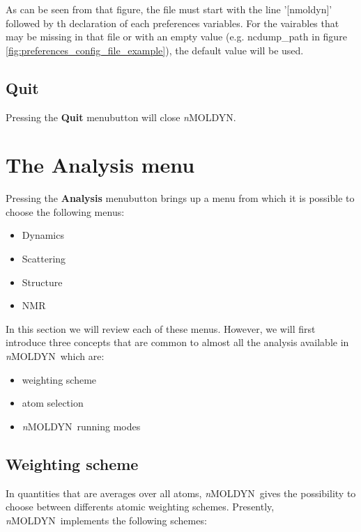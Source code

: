 \documentclass[a4paper,11pt]{report}
\newcommand{\NMOLDYN}{\textit{n}MOLDYN}
\begin{document}
As can be seen from that figure, the file must start with the line '[nmoldyn]' followed by th declaration of each preferences 
variables. For the vairables that may be missing in that file or with an empty value (e.g. ncdump\_path in figure 
\ref{fig:preferences_config_file_example}), the default value will be used.

\subsection{Quit}
\label{quit}
Pressing the \textbf{Quit} menubutton will close \NMOLDYN .

\section{The \textbf{Analysis} menu}
\label{analysis_menu}
Pressing the \textbf{Analysis} menubutton brings up a menu from which it is possible to choose the following menus:
\begin{itemize}
\item Dynamics
\item Scattering
\item Structure
\item NMR
\end{itemize}

In this section we will review each of these menus. However, we will first introduce three concepts that are common 
to almost all the analysis available in \NMOLDYN\ which are:
\begin{itemize}
\item weighting scheme
\item atom selection
\item \NMOLDYN\ running modes
\end{itemize}
\newpage
\subsection{Weighting scheme}
\label{weighting_scheme}
In quantities that are averages over all atoms, \NMOLDYN\ gives the possibility to choose between differents atomic weighting 
schemes. Presently, \NMOLDYN\ implements the following schemes:
\end{document}
